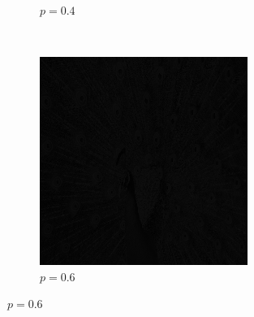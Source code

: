 \documentclass{article}
\begin{document}
\begin{enumerate}[label=(\alph*)]
\begin{figure}[!htb]
\begin{subfigure}[b]{0.3\textwidth}
            \caption{$p = 0.4$}
        \end{subfigure}
        ~
        \begin{subfigure}[b]{0.3\textwidth}
            \includegraphics[width=\textwidth]{img/PL06.png}
            \caption{$p = 0.6$}
        \end{subfigure}
        
        

\end{figure}
\end{enumerate}
\end{document}
